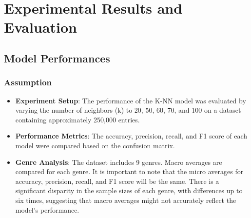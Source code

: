 \documentclass[times, twocolumn]{article}
\begin{document}
\section{Experimental Results and Evaluation}
\subsection{Model Performances}
\subsubsection{Assumption}
\begin{itemize}
    \item \textbf{Experiment Setup}: The performance of the K-NN model was evaluated by varying the number of neighbors (k) to 20, 50, 60, 70, and 100 on a dataset containing approximately 250,000 entries.
    \item \textbf{Performance Metrics}: The accuracy, precision, recall, and F1 score of each model were compared based on the confusion matrix.
    \item \textbf{Genre Analysis}: The dataset includes 9 genres. Macro averages are compared for each genre. It is important to note that the micro averages for accuracy, precision, recall, and F1 score will be the same. There is a significant disparity in the sample sizes of each genre, with differences up to six times, suggesting that macro averages might not accurately reflect the model's performance.
\end{itemize}
\end{document}
